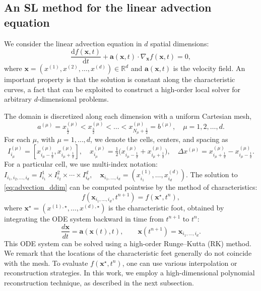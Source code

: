 \documentclass{article}
\theoremstyle{plain}
\theoremstyle{definition}
\theoremstyle{remark}
\begin{document}
\subsection{An SL method for the linear advection equation}

We consider the linear advection equation in $d$ spatial dimensions:
\begin{equation}\label{eq:advection_ddim}
    \frac{\mathrm{d}f(\bm{x},t)}{\mathrm{d}t} + \bm{a}(\bm{x},t)\cdot\nabla_{\bm{x}}f(\bm{x},t) = 0,
\end{equation}
where $\bm{x} = (x^{(1)}, x^{(2)}, \dots, x^{(d)}) \in \mathbb{R}^d$ and $\bm{a}(\bm{x},t)$ is the velocity field. An important property is that the solution is constant along the characteristic curves, a fact that can be exploited to construct a high-order local solver for arbitrary $d$-dimensional problems.

The domain is discretized along each dimension with a uniform Cartesian mesh,
\begin{equation*}
    a^{(\mu)} = x^{(\mu)}_{\frac{1}{2}} < x^{(\mu)}_{\frac{3}{2}} < \ldots < x^{(\mu)}_{N_{\mu}+\frac{1}{2}} = b^{(\mu)}, 
    \quad \mu=1,2,\ldots,d.
\end{equation*}
For each $\mu$, with $\mu = 1, \dots, d$, we denote the cells, centers, and spacing as
\begin{equation*}
    I^{(\mu)}_{i_{\mu}} = \left[x^{(\mu)}_{i_{\mu}-\frac{1}{2}},x^{(\mu)}_{i_{\mu}+\frac{1}{2}}\right], 
    \quad x^{(\mu)}_{i_{\mu}} = \tfrac{1}{2}\bigl(x^{(\mu)}_{i_{\mu}-\frac{1}{2}}+x^{(\mu)}_{i_{\mu}+\frac{1}{2}}\bigr), 
    \quad \Delta x^{(\mu)} = x^{(\mu)}_{i_{\mu}+\frac{1}{2}}-x^{(\mu)}_{i_{\mu}-\frac{1}{2}}.
\end{equation*}
For a particular cell, we use multi-index notation: 
$
I_{i_1,i_2,\ldots,i_d} = I^1_{i_1}\times I^2_{i_2} \times \cdots\times I^{d}_{i_d}, 
\quad \bm{x}_{i_1,\ldots,i_d}=(x^{(1)}_{i_1},\ldots,x^{(d)}_{i_d}).
$
The solution to \eqref{eq:advection_ddim} can be computed pointwise by the method of characteristics:
\begin{equation}
    f(\bm{x}_{i_1,\ldots,i_d},t^{n+1}) = f(\bm{x}^\star, t^n),
    \label{eq:SL_basic_formulation}
\end{equation}
where $\bm{x}^\star = (x^{(1),\star},\ldots,x^{(d),\star})$ is the characteristic foot, obtained by integrating the ODE system backward in time from $t^{n+1}$ to $t^{n}$:
\begin{equation}\label{eq:ODEs_characteristics}
    \dfrac{d\bm{x}}{dt} = \bm{a}(\bm{x}(t), t), \qquad    \bm{x}(t^{n+1}) = \bm{x}_{i_1,\ldots,i_d}.
\end{equation}
This ODE system can be solved using a high-order Runge--Kutta (RK) method. We remark that the locations of the characteristic feet generally do not coincide with the mesh. To evaluate 
$f(\bm{x}^\star,t^n)$, one can use various interpolation or reconstruction strategies. In this work, we employ a high-dimensional polynomial reconstruction technique, as described in the next subsection.
\end{document}
